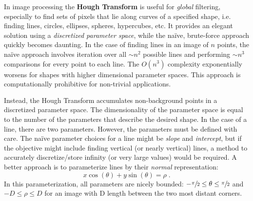 In image processing the \textbf{Hough Transform} is useful for \textit{global} filtering, especially to find sets of pixels that lie along curves of a specified shape, i.e. finding lines, circles, ellipses, spheres, hypercubes, etc. It provides an elegant solution using a \textit{discretized parameter space}, while the na\"ive, brute-force approach quickly becomes daunting. In the case of finding lines in an image of $n$ points, the na\"ive approach involves iteration over all $\sim\!\! n^2$ possible lines and performing $\sim\!\! n^3$ comparisons for every point to each line. The $O(n^3)$  complexity exponentially worsens for shapes with higher dimensional parameter spaces. This approach is computationally prohibitive for non-trivial applications.

Instead, the Hough Transform accumulates non-background points in a discretized parameter space. The dimensionality of the parameter space is equal to the number of the parameters that describe the desired shape. In the case of a line, there are two parameters. However, the parameters must be defined with care. The na\"ive parameter choices for a line might be \textit{slope} and \textit{intercept}, but if the objective might include finding vertical (or nearly vertical) lines, a method to accurately discretize/store infinity (or very large values) would be required. A better approach is to parameterize lines by their \textit{normal} representation:
\begin{equation}
x \cos (\theta) + y \sin(\theta) = \rho \; . \label{eq:hough:line}
\end{equation}
In this parameterization, all parameters are nicely bounded: $-\sfrac{\pi}{2} \leq \theta \leq \sfrac{\pi}{2}$ and $-D\leq \rho \leq D$ for an image with D length between the two most distant corners.

